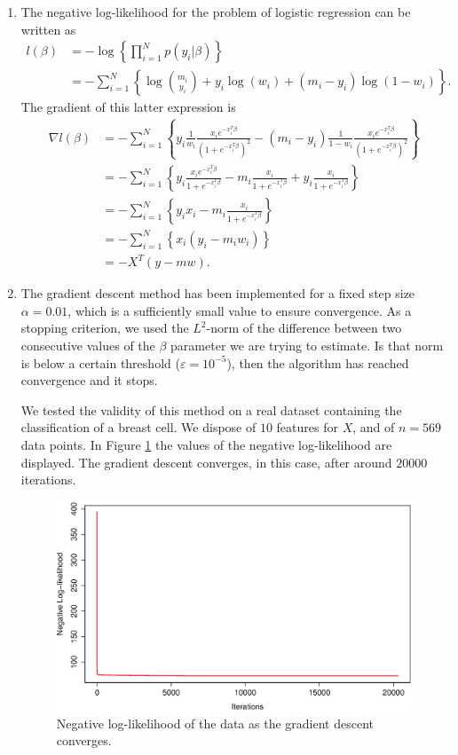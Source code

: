 \documentclass{homework}
\begin{document}
\begin{enumerate}[label=(\Alph*)]
\item The negative log-likelihood for the problem of logistic regression can be written as
\begin{align*}
l(\beta) &= - \log\left\lbrace \prod_{i=1}^N p(y_i | \beta) \right\rbrace
\\
&= -\sum_{i=1}^N \left\lbrace \log \binom{m_i}{y_i} + y_i \log(w_i) + (m_i - y_i) \log (1 - w_i) \right\rbrace.
\end{align*}
The gradient of this latter expression is 
\begin{align*}
\nabla l(\beta) &= - \sum_{i=1}^N \left\lbrace y_i \frac{1}{w_i} \frac{x_i e^{-x_i^T \beta}}{(1+e^{-x_i^T \beta})^2} - (m_i - y_i) \frac{1}{1-w_i} \frac{x_i e^{-x_i^T \beta}}{(1+e^{-x_i^T \beta})^2} \right\rbrace
\\
&= - \sum_{i=1}^N \left\lbrace y_i \frac{x_i e^{-x_i^T \beta}}{1+e^{-x_i^T \beta}} - m_i \frac{x_i}{1+e^{-x_i^T \beta}} + y_i \frac{x_i}{1+e^{-x_i^T \beta}} \right\rbrace
\\
&= - \sum_{i=1}^N \left\lbrace y_i x_i - m_i \frac{x_i}{1+e^{-x_i^T \beta}} \right\rbrace
\\
&= - \sum_{i=1}^N \left\lbrace x_i (y_i - m_i w_i) \right\rbrace
\\
&= -X^T (y - mw).
\end{align*}

\item The gradient descent method has been implemented for a fixed step size $\alpha = 0.01$, which is a sufficiently small value to ensure convergence. As a stopping criterion, we used the $L^2$-norm of the difference between two consecutive values of the $\beta$ parameter we are trying to estimate. Is that norm is below a certain threshold ($\varepsilon = 10^{-5}$), then the algorithm has reached convergence and it stops.

We tested the validity of this method on a real dataset containing the classification of a breast cell. We dispose of $10$ features for $X$, and of $n = 569$ data points. In Figure \ref{fig:grad} the values of the negative log-likelihood are displayed. The gradient descent converges, in this case, after around $20000$ iterations.

\begin{figure}[!ht]
\centering
\includegraphics[width=0.6\columnwidth]{./Img/ll}
\caption{Negative log-likelihood of the data as the gradient descent converges.}
\label{fig:grad}
\end{figure}


\end{enumerate}
\end{document}
